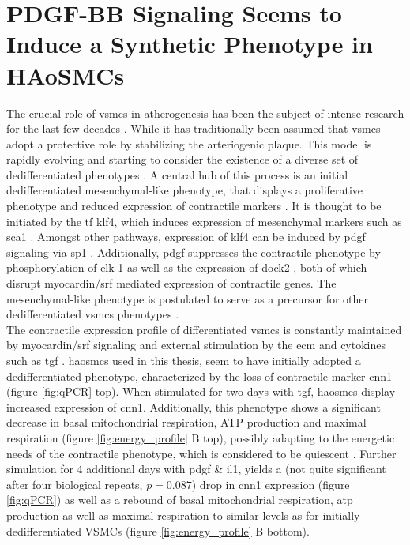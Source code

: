 \section{PDGF-BB Signaling Seems to Induce a Synthetic Phenotype in HAoSMCs}
The crucial role of \acp{vsmc} in atherogenesis has been the subject of intense research for the last few decades \cite{grootaertVascularSmoothMuscle2021, yapSixShadesVascular2021}. While it has traditionally been assumed that \acp{vsmc} adopt a protective role by stabilizing the arteriogenic plaque. This model is rapidly evolving and starting to consider the existence of a diverse set of dedifferentiated phenotypes \cite{liuSmoothMuscleCell2019}. A central hub of this process is an initial dedifferentiated mesenchymal-like phenotype, that displays a proliferative phenotype and reduced expression of contractile markers \cite{yapSixShadesVascular2021}. It is thought to be initiated by the \ac{tf} \ac{klf4}, which induces expression of mesenchymal markers such as \ac{sca1} \cite{yapSixShadesVascular2021}. Amongst other pathways, expression of \ac{klf4} can be induced by \ac{pdgf} signaling \cite{liuKruppellikeFactorAbrogates2005} via \ac{sp1} \cite{deatonSp1dependentActivationKLF42009}. Additionally, \ac{pdgf} suppresses the contractile phenotype by phosphorylation of \ac{elk-1} \cite{wangMyocardinTernaryComplex2004} as well as the expression of \ac{dock2} \cite{guoDedicatorCytokinesisNovel2015}, both of which disrupt myocardin/\ac{srf} mediated expression of contractile genes. The mesenchymal-like phenotype is postulated to serve as a precursor for other dedifferentiated \acp{vsmc} phenotypes \cite{yapSixShadesVascular2021}.\\
The contractile expression profile of differentiated \acp{vsmc} is constantly maintained by myocardin/\ac{srf} signaling \cite{longMyocardinSufficientSmooth2008} and external stimulation by the \ac{ecm} and cytokines such as \ac{tgf} \cite{davis-dusenberyDownregulationKruppellikeFactor42011}. \acp{haosmc} used in this thesis, seem to have initially adopted a dedifferentiated phenotype, characterized by the loss of contractile marker \ac{cnn1} \cite{owensMolecularRegulationVascular2004} (figure \ref{fig:qPCR} top). When stimulated for two days with \ac{tgf}, \acp{haosmc} display increased expression of \ac{cnn1}. Additionally, this phenotype shows a significant decrease in  basal mitochondrial respiration, ATP production and maximal respiration (figure \ref{fig:energy_profile} B top), possibly adapting to the energetic needs of the contractile phenotype, which is considered to be quiescent \cite{dobnikarDiseaserelevantTranscriptionalSignatures2018}. Further simulation for 4 additional days with \ac{pdgf} \& \ac{il1}, yields a (not quite significant after four biological repeats, $p=0.087$) drop in \ac{cnn1} expression (figure \ref{fig:qPCR}) as well as a rebound of basal mitochondrial respiration, \ac{atp} production as well as maximal respiration to similar levels as for initially dedifferentiated VSMCs (figure \ref{fig:energy_profile} B bottom).\\
